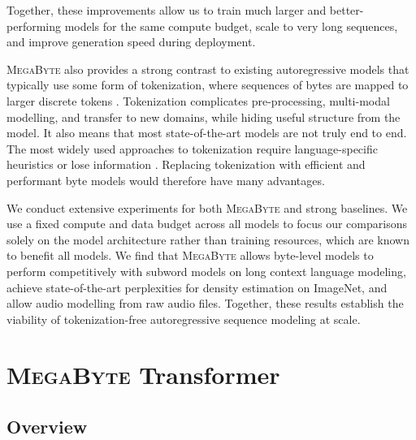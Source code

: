 \documentclass{article}
\newcommand{\fastslow}[0]{\textsc{MegaByte}\xspace}
\newcommand{\megabyte}[0]{\fastslow}
\theoremstyle{plain}
\theoremstyle{definition}
\theoremstyle{remark}
\begin{document}
Together, these improvements allow us to train much larger and better-performing models for the same compute budget, scale to very long sequences, and improve generation speed during deployment.

\fastslow also provides a strong contrast to existing autoregressive models that typically use some form of tokenization, where sequences of bytes are mapped to larger discrete tokens \citep{bpe,dalle,hubert}.
Tokenization complicates pre-processing, multi-modal modelling, and transfer to new domains, while hiding useful structure from the model. It also means that most state-of-the-art models are not truly end to end.
The most widely used approaches to tokenization require language-specific heuristics \citep{gpt2} or lose information \citep{dalle}.
Replacing tokenization with efficient and performant byte models would therefore have many advantages.

We conduct extensive experiments for both \fastslow and strong baselines. We use a fixed compute and data budget across all models 
to focus our comparisons solely on the model architecture rather than training resources, which are known to benefit all models. We find that \fastslow allows byte-level models to perform competitively with subword models on long context language modeling, achieve state-of-the-art perplexities for density estimation on ImageNet, and allow audio modelling from raw audio files. Together, these results establish the viability of tokenization-free autoregressive sequence modeling at scale.

\section{\megabyte Transformer}
\subsection{Overview}
\label{sec:fastslow}
\end{document}

